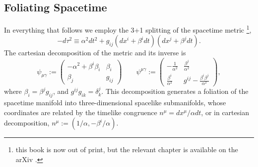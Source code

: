 \subsection{Foliating Spacetime}
\label{ssec:adm_metric}
In everything that follows we employ the 3+1 splitting of the spacetime metric
\citep[Chap.~7]{witt1962-book_with_adm_intro}\footnote{this book is now out of
print, but the relevant chapter is available on the arXiv \citep{arno2008-adm}.},
\begin{equation}
  -d\tau^2 \equiv \alpha^2dt^2 + g_{ij}(dx^i+\beta^idt)(dx^j+\beta^jdt).
\end{equation}
The cartesian decomposition of the metric and its inverse is
\begin{equation}
  \psi_{\mu\gamma} :=
  \left(
  \begin{matrix}
    -\alpha^2 + \beta^i \beta_i  & \beta_i \\
    \beta_j                      & g_{ij}
  \end{matrix}
  \right)
  \qquad
  \psi^{\mu\gamma} :=
  \left(
  \begin{matrix}
    -\frac{1}{\alpha^2}          & \frac{\beta^j}{\alpha^2} \\
    \frac{\beta^i}{\alpha^2}     & g^{ij} - \frac{\beta^i \beta^j}{\alpha^2}
  \end{matrix}
  \right),
\end{equation}
where $\beta_i=\beta^j g_{ij}$, and $g^{ij}g_{ik}=\delta^{j}_{k}$.
This decomposition generates a foliation of the spacetime manifold into
three-dimensional spacelike submanifolds, whose coordinates are related
by the timelike congruence $n^\mu=dx^\mu/\alpha dt$, or in cartesian
decomposition, $n^\mu:=(1/\alpha,-\beta^i/\alpha)$.

